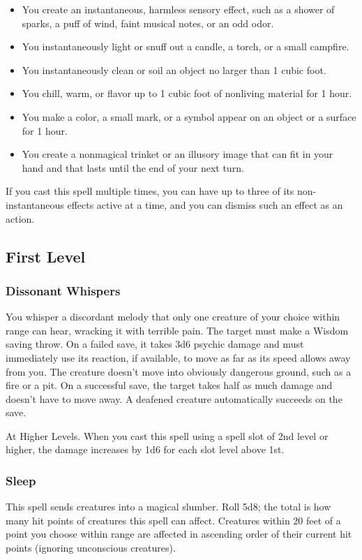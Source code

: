 \documentclass[11pt]{article}
\begin{document}
\begin{itemize}
\item You create an instantaneous, harmless sensory effect, such as a shower of sparks, a puff of wind, faint musical notes, or an odd odor.
\item You instantaneously light or snuff out a candle, a torch, or a small campfire.
\item You instantaneously clean or soil an object no larger than 1 cubic foot.
\item You chill, warm, or flavor up to 1 cubic foot of nonliving material for 1 hour.
\item You make a color, a small mark, or a symbol appear on an object or a surface for 1 hour.
\item You create a nonmagical trinket or an illusory image that can fit in your hand and that lasts until the end of your next turn.
\end{itemize}
If you cast this spell multiple times, you can have up to three of its non-instantaneous effects active at a time, and you can dismiss such an effect as an action.
\subsection{First Level}
\label{sec:org140db20}
\subsubsection{Dissonant Whispers}
\label{sec:org77e32b0}
You whisper a discordant melody that only one creature of your choice within range can hear, wracking it with terrible pain. The target must make a Wisdom saving throw. On a failed save, it takes 3d6 psychic damage and must immediately use its reaction, if available, to move as far as its speed allows away from you. The creature doesn't move into obviously dangerous ground, such as a fire or a pit. On a successful save, the target takes half as much damage and doesn't have to move away. A deafened creature automatically succeeds on the save.

At Higher Levels. When you cast this spell using a spell slot of 2nd level or higher, the damage increases by 1d6 for each slot level above 1st.
\subsubsection{Sleep}
\label{sec:org3cde44e}
This spell sends creatures into a magical slumber. Roll 5d8; the total is how many hit points of creatures this spell can affect. Creatures within 20 feet of a point you choose within range are affected in ascending order of their current hit points (ignoring unconscious creatures).
\end{document}
